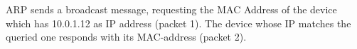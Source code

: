 ARP sends a broadcast message, requesting the MAC Address of the device which has 10.0.1.12 as IP address (packet 1). The device whose IP matches the queried one responds with its MAC-address (packet 2).